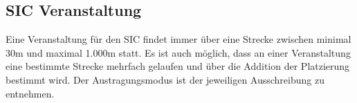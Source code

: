 \subsection{SIC Veranstaltung}
Eine Veranstaltung für den SIC findet immer über eine Strecke zwischen minimal 30m und maximal 1.000m statt. Es ist auch möglich, dass an einer Veranstaltung eine bestimmte Strecke mehrfach gelaufen und über die Addition der Platzierung bestimmt wird. Der Austragungsmodus ist der jeweiligen Ausschreibung zu entnehmen.
